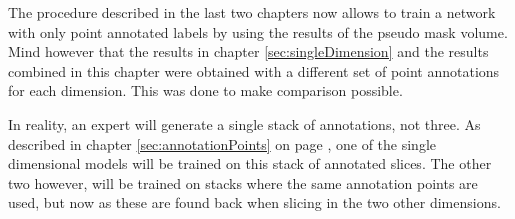 \par{
    The procedure described in the last two chapters now allows to train a network with only point annotated labels by using the results of the pseudo mask volume.
    Mind however that the results in chapter \ref{sec:singleDimension} and the results combined in this chapter were obtained with a different set of point annotations for each dimension.
    This was done to make comparison possible.
}
\par{
    In reality, an expert will generate a single stack of annotations, not three.
    As described in chapter \ref{sec:annotationPoints} on page \pageref{sec:annotationPoints}, one of the single dimensional models will be trained on this stack of annotated slices.
    The other two however, will be trained on stacks where the same annotation points are used, but now as these are found back when slicing in the two other dimensions.
}

